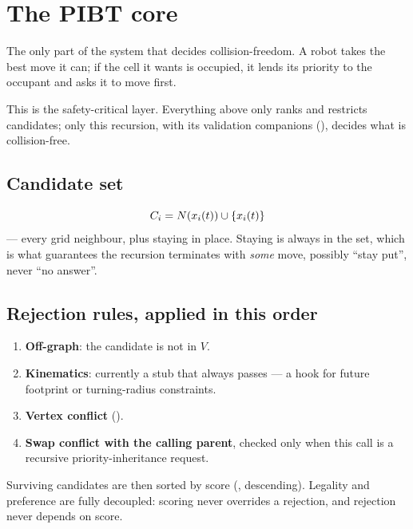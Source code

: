 \section{The PIBT core}
\label{sec:pibt}

\begin{lede}
The only part of the system that decides collision-freedom. A robot takes the
best move it can; if the cell it wants is occupied, it lends its priority to
the occupant and asks it to move first.
\end{lede}

This is the safety-critical layer. Everything above only ranks and restricts
candidates; only this recursion, with its validation companions
(), decides what is collision-free.

\subsection{Candidate set}

\begin{equation}
  C_i = N(x_{i}(t)) \cup \{x_{i}(t)\}
\end{equation}
--- every grid neighbour, plus staying in place. Staying is always in the set,
which is what guarantees the recursion terminates with \emph{some} move,
possibly ``stay put'', never ``no answer''.

\subsection{Rejection rules, applied in this order}
\label{sec:pibt-rejection}

\begin{enumerate}
\item \textbf{Off-graph}: the candidate is not in $V$.
\item \textbf{Kinematics}: currently a stub that always passes --- a hook for
  future footprint or turning-radius constraints.
\item \textbf{Vertex conflict} ().
\item \textbf{Swap conflict with the calling parent}, checked only when this
  call is a recursive priority-inheritance request.
\end{enumerate}

Surviving candidates are then sorted by score (,
descending). Legality and preference are fully decoupled: scoring never
overrides a rejection, and rejection never depends on score.

